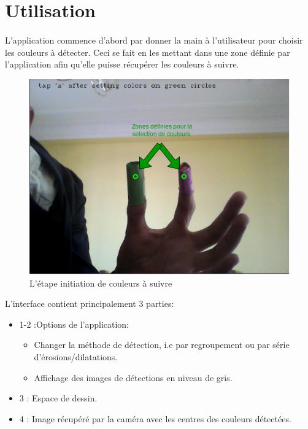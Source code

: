 \documentclass[12pt]{report}
\begin{document}
	\section{Utilisation}
	\paragraph{}
	L’application commence d’abord par donner la main à l’utilisateur pour choisir les couleurs à détecter. Ceci se fait en les mettant dans une zone définie par l’application afin qu’elle puisse récupérer les couleurs à suivre.\\
	\begin{figure}[H]
		\centering
		\includegraphics[scale=0.6]{imgs/initColors.png}
		\caption{L'étape initiation de couleurs à suivre}
		\label{fig:InitColors}
	\end{figure}
	\newpage
	L’interface contient principalement 3 parties:
	\begin{itemize}
		\item 1-2 :Options de l’application:
		\begin{itemize}
			\item Changer la méthode de détection, i.e par regroupement ou par série d’érosions/dilatations.
			\item Affichage des images de détections en niveau de gris.
		\end{itemize}
		\item 3 : Espace de dessin.
		\item 4 : Image récupéré par la caméra avec les centres des couleurs détectées.
	\end{itemize}
\end{document}
